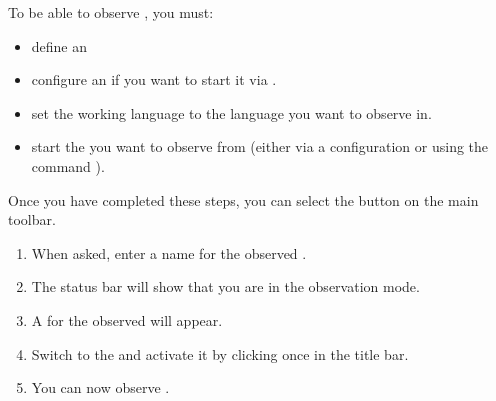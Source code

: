 
\label{startobs}
To be able to observe \gdsteps{}, you must:
\begin{itemize}
\item define an \gdaut{} 
\item configure an \gdaut{}  if you want to start it via \app{}. 
\item set the working language to the language you want to observe in.
\item start the \gdaut{} you want to observe from  (either via a configuration  or using the  command ). 
\end{itemize}

Once you have completed these steps, you can select the  button 
on the main toolbar.
\begin{enumerate}
 \item When asked, enter a name for the observed \gdcase{}.
 \item The status bar will show that you are in the observation mode. 
 \item A \gdtestcaseeditor{} for the observed \gdcase{} will appear. 
 \item Switch to the \gdaut and activate it by clicking once in the title bar.
 \item You can now observe \gdsteps{}.
\end{enumerate}


 


 
